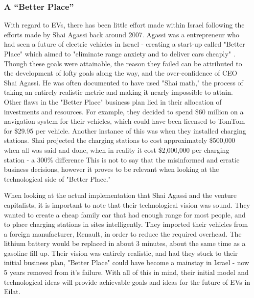 \documentclass[12pt]{article}                         %
\begin{document}

\subsubsection{A ``Better Place''}
With regard to EVs, there has been little effort made within Israel following the efforts made by Shai Agassi back around 2007. Agassi was a entrepreneur who had seen a future of electric vehicles in Israel - creating a start-up called "Better Place" which aimed to "eliminate range anxiety and to deliver cars cheaply" \cite{ChafkinAGoing}. Though these goals were attainable, the reason they failed can be attributed to the development of lofty goals along the way, and the over-confidence of CEO Shai Agassi. He was often documented to have used "Shai math," the process of taking an entirely realistic metric and making it nearly impossible to attain. Other flaws in the "Better Place" business plan lied in their allocation of investments and resources. For example, they decided to spend \$60 million on a navigation system for their vehicles, which could have been licensed to TomTom for \$29.95 per vehicle. Another instance of this was when they installed charging stations. Shai projected the charging stations to cost approximately \$500,000 when all was said and done, when in reality it cost \$2,000,000 per charging station - a 300\% difference \cite{ChafkinAGoing} This is not to say that the misinformed and erratic business decisions, however it proves to be relevant when looking at the technological side of "Better Place." 

When looking at the actual implementation that Shai Agassi and the venture capitalists, it is important to note that their technological vision was sound. They wanted to create a cheap family car that had enough range for most people, and to place charging stations in sites intelligently. They imported their vehicles from a foreign manufacturer, Renault, in order to reduce the required overhead. The lithium battery would be replaced in about 3 minutes, about the same time as a gasoline fill up. Their vision was entirely realistic, and had they stuck to their initial business plan, "Better Place" could have become a mainstay in Israel - now 5 years removed from it's failure. With all of this in mind, their initial model and technological ideas will provide achievable goals and ideas for the future of EVs in Eilat.
\end{document}
